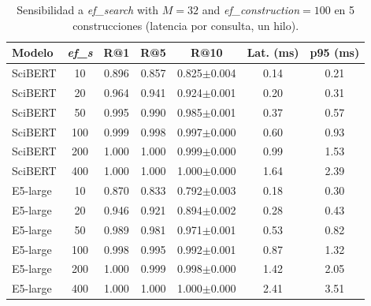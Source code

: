 \begin{table}[tbp]
\caption{Sensibilidad a \textit{ef\_search} with $M=32$ and \textit{ef\_construction}$=100$ en 5 construcciones (latencia por consulta, un hilo).}\label{tab:efsearch}
\centering
\small
\begin{tabular}{|l|c|c|c|c|c|c|}
\hline
\textbf{Modelo} & \textbf{\textit{ef\_s}} & \textbf{R@1} & \textbf{R@5} & \textbf{R@10} & \textbf{Lat. (ms)} & \textbf{p95 (ms)} \\
\hline
SciBERT & 10 & 0.896 & 0.857 & 0.825$\pm$0.004 & 0.14 & 0.21 \\
SciBERT & 20 & 0.964 & 0.941 & 0.924$\pm$0.001 & 0.20 & 0.31 \\
SciBERT & 50 & 0.995 & 0.990 & 0.985$\pm$0.001 & 0.37 & 0.57 \\
SciBERT & 100 & 0.999 & 0.998 & 0.997$\pm$0.000 & 0.60 & 0.93 \\
SciBERT & 200 & 1.000 & 1.000 & 0.999$\pm$0.000 & 0.99 & 1.53 \\
SciBERT & 400 & 1.000 & 1.000 & 1.000$\pm$0.000 & 1.64 & 2.39 \\
E5-large & 10 & 0.870 & 0.833 & 0.792$\pm$0.003 & 0.18 & 0.30 \\
E5-large & 20 & 0.946 & 0.921 & 0.894$\pm$0.002 & 0.28 & 0.43 \\
E5-large & 50 & 0.989 & 0.981 & 0.971$\pm$0.001 & 0.53 & 0.82 \\
E5-large & 100 & 0.998 & 0.995 & 0.992$\pm$0.001 & 0.87 & 1.32 \\
E5-large & 200 & 1.000 & 0.999 & 0.998$\pm$0.000 & 1.42 & 2.05 \\
E5-large & 400 & 1.000 & 1.000 & 1.000$\pm$0.000 & 2.41 & 3.51 \\
\hline
\end{tabular}
\end{table}